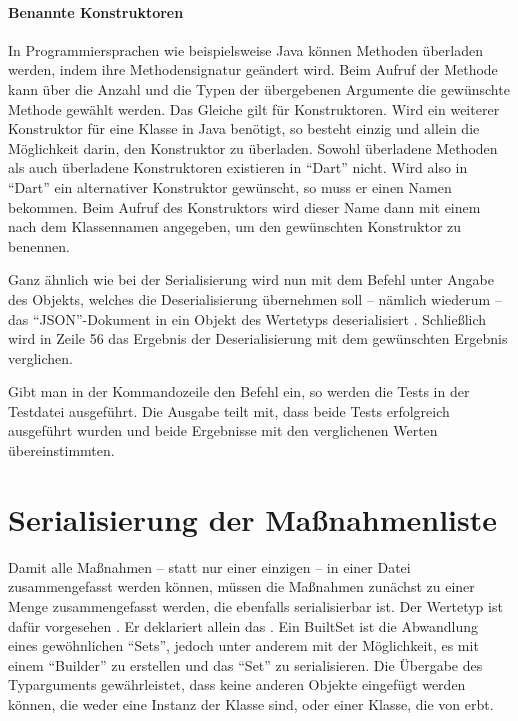 \paragraph{Benannte Konstruktoren} In Programmiersprachen wie beispielsweise Java können Methoden überladen werden, indem ihre Methodensignatur geändert wird.
Beim Aufruf der Methode kann über die Anzahl und die Typen der übergebenen Argumente die gewünschte Methode gewählt werden.
Das Gleiche gilt für Konstruktoren.
Wird ein weiterer Konstruktor für eine Klasse in Java benötigt, so besteht einzig und allein die Möglichkeit darin, den Konstruktor zu überladen.
Sowohl überladene Methoden als auch überladene Konstruktoren existieren in \enquote{Dart} nicht.
Wird also in \enquote{Dart} ein alternativer Konstruktor gewünscht, so muss er einen Namen bekommen.
Beim Aufruf des Konstruktors wird dieser Name dann mit einem  nach dem Klassennamen angegeben, um den gewünschten Konstruktor zu benennen.


Ganz ähnlich wie bei der Serialisierung wird nun mit dem Befehl    unter Angabe des Objekts,
welches die Deserialisierung übernehmen soll -- nämlich wiederum  -- das \enquote{JSON}-Dokument in ein Objekt des Wertetyps  deserialisiert .
Schließlich wird in Zeile 56 das Ergebnis der Deserialisierung mit dem gewünschten Ergebnis verglichen.



Gibt man in der Kommandozeile den Befehl    ein,
so werden die Tests in der Testdatei ausgeführt.
Die Ausgabe  teilt mit,
dass beide Tests erfolgreich ausgeführt wurden und beide Ergebnisse mit den verglichenen Werten übereinstimmten.

\clearpage
\section{Serialisierung der Maßnahmenliste}

Damit alle Maßnahmen -- statt nur einer einzigen -- in einer Datei zusammengefasst werden können, müssen die Maßnahmen zunächst zu einer Menge zusammengefasst werden, die ebenfalls serialisierbar ist.
Der Wertetyp  ist dafür vorgesehen \Lst{\ref{lst:Schritt1WerteTypStorage}}.
Er deklariert allein das  .
Ein BuiltSet ist die Abwandlung eines gewöhnlichen \enquote{Sets}, jedoch unter anderem mit der Möglichkeit, es mit einem \enquote{Builder} zu erstellen und das \enquote{Set} zu serialisieren.
Die Übergabe des Typarguments  gewährleistet, dass keine anderen Objekte eingefügt werden können, die weder eine Instanz der Klasse  sind, oder einer Klasse, die von  erbt.

